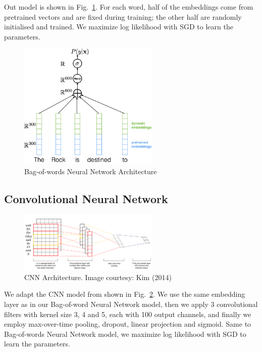\documentclass[11pt]{article}
\begin{document}
Out model is shown in Fig.~\ref{fig:network_cbow}.
For each word, half of the embeddings come from pretrained vectors and are fixed during training; the other half are randomly initialised and trained. 
We maximize log likelihood with SGD to learn the parameters.
\begin{figure}[H]
    \centering
    \includegraphics[width=0.6\textwidth]{HW1/writeup/images/network_cbow.png}
    \caption{Bag-of-words Neural Network Architecture}
    \label{fig:network_cbow}
\end{figure}


\subsection{Convolutional Neural Network}
\begin{figure}[H]
    \centering
    \includegraphics[width=0.6\textwidth]{HW1/writeup/images/network_cnn.png}
    \caption{CNN Architecture. Image courtesy: Kim (2014)}
    \label{fig:network_cnn}
\end{figure}
We adapt the CNN model from \cite{kim2014convolutional} shown in Fig.~\ref{fig:network_cnn}.
We use the same embedding layer as in our Bag-of-word Neural Network model, then we apply 3 convolutional filters with kernel size 3, 4 and 5, each with 100 output channels, and finally we employ max-over-time pooling, dropout, linear projection and sigmoid.
Same to Bag-of-words Neural Network model, we maximize log likelihood with SGD to learn the parameters.
\end{document}
